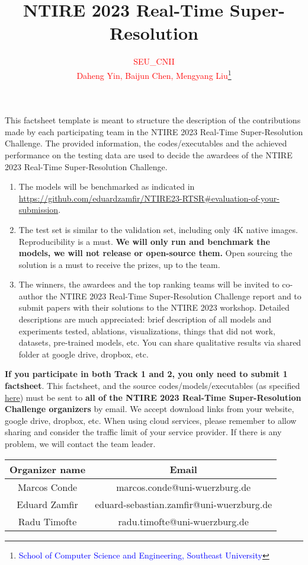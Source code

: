 \documentclass{article}
\title{NTIRE 2023 Real-Time Super-Resolution}
\author{\textcolor{red}{SEU\_CNII}\\
\textcolor{red}{Daheng Yin, Baijun Chen, Mengyang Liu}\thanks{\textcolor{blue}{School of Computer Science and Engineering, Southeast University}}\\
}
\begin{document}
\maketitle

This factsheet template is meant to structure the description of the contributions made by each participating team in the NTIRE 2023 Real-Time Super-Resolution Challenge.
%
The provided information, the codes/executables and the achieved performance on the testing data are used to decide the awardees of the NTIRE 2023 Real-Time Super-Resolution Challenge. 

\begin{enumerate}
    \item The models will be benchmarked as indicated in \url{https://github.com/eduardzamfir/NTIRE23-RTSR#evaluation-of-your-submission}.
    \item The test set is similar to the validation set, including only 4K native images. Reproducibility is a must. \textbf{We will only run and benchmark the models, we will not release or open-source them.} Open sourcing the solution is a must to receive the prizes, up to the team.
    \item The winners, the awardees and the top ranking teams will be invited to co-author the NTIRE 2023 Real-Time Super-Resolution Challenge report and to submit papers with their solutions to the NTIRE 2023 workshop. Detailed descriptions are much appreciated: brief description of all models and experiments tested, ablations, visualizations, things that did not work, datasets, pre-trained models, etc. You can share qualitative results via shared folder at google drive, dropbox, etc.
\end{enumerate}

\textbf{If you participate in both Track 1 and 2, you only need to submit 1 factsheet}.
This factsheet, and the source codes/models/executables (as specified \href{https://github.com/eduardzamfir/NTIRE23-RTSR#evaluation-of-your-submission}{here}) must be sent to \textbf{all of the NTIRE 2023 Real-Time Super-Resolution Challenge organizers} by email. We accept download links from your website, google drive, dropbox, etc. When using cloud services, please remember to allow sharing and consider the traffic limit of your service provider. If there is any problem, we will contact the team leader.

\begin{table}[h]
\begin{center}
\begin{tabular}{|c|c|}
    \hline
    Organizer name & Email \\
    \hline
    Marcos Conde  & marcos.conde@uni-wuerzburg.de  \\
    Eduard Zamfir & eduard-sebastian.zamfir@uni-wuerzburg.de  \\
    Radu Timofte  & radu.timofte@uni-wuerzburg.de \\
    \hline
\end{tabular}
\vspace{-0.5cm}
\end{center}
\end{table}
 \newpage
\end{document}
